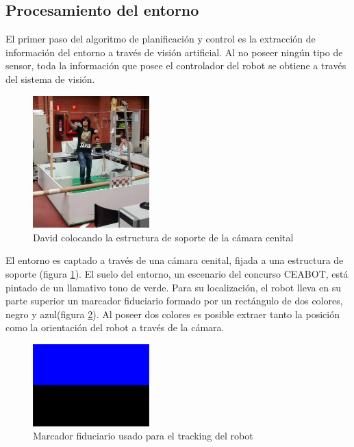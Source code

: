 \subsection{Procesamiento del entorno}
\label{procesamiento}

El primer paso del algoritmo de planificación y control es la extracción de información del entorno a través de visión artificial. Al no poseer ningún tipo de sensor, toda la información que posee el controlador del robot se obtiene a través del sistema de visión.\\

\begin{figure}[H]
        \centering
        \includegraphics[width=0.4\textwidth]{images/escenario.jpg}
        \caption{David colocando la estructura de soporte de la cámara cenital}
        \label{fig:foto_estructura_nave}
\end{figure} 

El entorno es captado a través de una cámara cenital, fijada a una estructura de soporte (figura \ref{fig:foto_estructura_nave}). El suelo del entorno, un escenario del concurso CEABOT, está pintado de un llamativo tono de verde. Para su localización, el robot lleva en su parte superior un marcador fiduciario formado por un rectángulo de dos colores, negro y azul(figura \ref{fig:marcador_fiduciario}). Al poseer dos colores es posible extraer tanto la posición como la orientación del robot a través de la cámara.\\

\begin{figure}[H]
        \centering
        \includegraphics[width=0.4\textwidth]{images/marcador.png}
        \caption{Marcador fiduciario usado para el tracking del robot}
        \label{fig:marcador_fiduciario}
\end{figure} 

